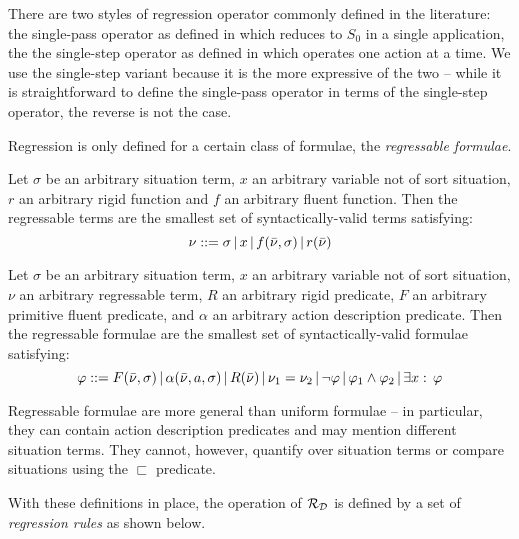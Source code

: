 There are two styles of regression operator commonly defined in the
literature: the single-pass operator as defined in \citep{pirri99contributions_sitcalc}
which reduces to $S_{0}$ in a single application, the the single-step
operator as defined in \citep{scherl03sc_knowledge} which operates
one action at a time. We use the single-step variant because it is
the more expressive of the two -- while it is straightforward to define
the single-pass operator in terms of the single-step operator, the
reverse is not the case.

Regression is only defined for a certain class of formulae, the \emph{regressable
formulae}.

\begin{defnL}
 Let $\sigma$ be an arbitrary situation
term, $x$ an arbitrary variable not of sort situation, $r$ an arbitrary
rigid function and $f$ an arbitrary fluent function. Then the regressable
terms are the smallest set of syntactically-valid terms satisfying:
\[
\nu::=\sigma\,|\, x\,|\, f(\bar{\nu},\sigma)\,|\, r(\bar{\nu})\]

\begin{defnL}
 \label{def:Background:Regressable-Formulae}Let
$\sigma$ be an arbitrary situation term, $x$ an arbitrary variable
not of sort situation, $\nu$ an arbitrary regressable term, $R$
an arbitrary rigid predicate, $F$ an arbitrary primitive fluent predicate,
and $\alpha$ an arbitrary action description predicate. Then the
regressable formulae are the smallest set of syntactically-valid formulae
satisfying: \[
\varphi::=F(\bar{\nu},\sigma)\,|\,\alpha(\bar{\nu},a,\sigma)\,|\, R(\bar{\nu})\,|\,\nu_{1}=\nu_{2}\,|\,\neg\varphi\,|\,\varphi_{1}\wedge\varphi_{2}\,|\,\exists x:\,\varphi\]

\end{defnL}
\end{defnL}
Regressable formulae are more general than uniform formulae -- in
particular, they can contain action description predicates and may
mention different situation terms. They cannot, however, quantify
over situation terms or compare situations using the $\sqsubset$
predicate.

With these definitions in place, the operation of $\mathcal{R}_{\mathcal{D}}$ is
defined by a set of \emph{regression rules} as shown below.


